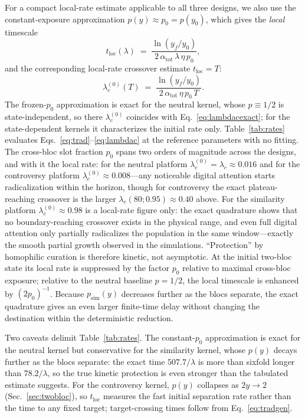 \documentclass[5p,times,twocolumn]{elsarticle}
\begin{document}
For a compact local-rate estimate applicable to all three designs, we
also use the constant-exposure approximation
$p(y) \approx p_0 = p(y_0)$, which gives the \emph{local} timescale
\begin{equation}
  t_{\mathrm{loc}}(\lambda)
  \;=\;
  \frac{\ln (y_f / y_0)}{2\,\alpha_{\mathrm{tot}}\,\lambda\,\eta\, p_0},
  \label{eq:trad}
\end{equation}
and the corresponding local-rate crossover estimate $t_{\mathrm{loc}} = T$:
\begin{equation}
  \lambda_c^{(0)}(T)
  \;=\;
  \frac{\ln (y_f / y_0)}{2\,\alpha_{\mathrm{tot}}\,\eta\, p_0\, T}.
  \label{eq:lambdac}
\end{equation}
The frozen-$p_0$ approximation is exact for the neutral kernel, whose
$p \equiv 1/2$ is state-independent, so there
$\lambda_c^{(0)}$ coincides with Eq.~\eqref{eq:lambdacexact}; for the
state-dependent kernels it characterizes the initial rate only.
Table~\ref{tab:rates} evaluates Eqs.~\eqref{eq:trad}--\eqref{eq:lambdac}
at the reference parameters with no fitting. The cross-bloc slot fraction
$p_0$ spans two orders of magnitude across the designs, and with it the
local rate: for the neutral platform
$\lambda_c^{(0)} = \lambda_c \approx 0.016$ and for the controversy
platform $\lambda_c^{(0)} \approx 0.008$---any noticeable digital
attention starts radicalization within the horizon, though for
controversy the exact plateau-reaching crossover is the larger
$\lambda_c(80;0.95) \approx 0.40$ above. For the similarity platform
$\lambda_c^{(0)} \approx 0.98$ is a local-rate figure only: the exact
quadrature shows that no boundary-reaching crossover exists in the
physical range, and even full digital attention only partially
radicalizes the population in the same window---exactly the smooth
partial growth observed in the simulations. ``Protection'' by homophilic
curation is therefore kinetic, not asymptotic. At the initial two-bloc
state its local rate is suppressed by the factor $p_0$ relative to maximal
cross-bloc exposure; relative to the neutral baseline $p=1/2$, the local
timescale is enhanced by $(2p_0)^{-1}$. Because $p_{\mathrm{sim}}(y)$
decreases further as the blocs separate, the exact quadrature gives an
even larger finite-time delay without changing the destination within the
deterministic reduction.

Two caveats delimit Table~\ref{tab:rates}. The constant-$p_0$
approximation is exact for the neutral kernel but conservative for the
similarity kernel, whose $p(y)$ decays further as the blocs separate: the
exact time $507.7/\lambda$ is more than sixfold longer than
$78.2/\lambda$, so the true kinetic protection is even stronger than the
tabulated estimate suggests. For the controversy kernel, $p(y)$ collapses
as $2y \to 2$ (Sec.~\ref{sec:twobloc}), so $t_{\mathrm{loc}}$ measures the
fast initial separation rate rather than the time to any fixed target;
target-crossing times follow from Eq.~\eqref{eq:tradgen}.
\end{document}
